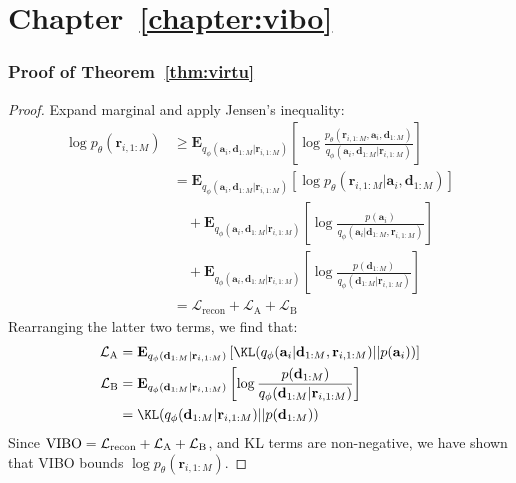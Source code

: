 \section{Chapter~\ref{chapter:vibo}}
\label{sec:proof:vibo}
\subsubsection{Proof of Theorem~\ref{thm:virtu}}

\begin{proof}
    Expand marginal and apply Jensen's inequality:
    \begin{align*}
        \log p_\theta(\mathbf{r}_{i,1:M}) &\geq \mathbf{E}_{q_\phi(\mathbf{a}_i, \mathbf{d}_{1:M}|\mathbf{r}_{i,1:M})}\left[ \log \frac{p_\theta(\mathbf{r}_{i,1:M},\mathbf{a}_i, \mathbf{d}_{1:M})}{q_\phi(\mathbf{a}_i, \mathbf{d}_{1:M}|\mathbf{r}_{i,1:M})} \right] \\
        &= \mathbf{E}_{q_\phi(\mathbf{a}_i, \mathbf{d}_{1:M}|\mathbf{r}_{i,1:M})}\left[ \log p_\theta(\mathbf{r}_{i,1:M}|\mathbf{a}_i, \mathbf{d}_{1:M}) \right] \\
        & \quad + \mathbf{E}_{q_\phi(\mathbf{a}_i, \mathbf{d}_{1:M}|\mathbf{r}_{i,1:M})}\left[ \log \frac{p(\mathbf{a}_i)}{q_\phi(\mathbf{a}_i|\mathbf{d}_{1:M},\mathbf{r}_{i,1:M})} \right] \\
        & \quad + \mathbf{E}_{q_\phi(\mathbf{a}_i, \mathbf{d}_{1:M}|\mathbf{r}_{i,1:M})}\left[ \log \frac{p(\mathbf{d}_{1:M})}{q_\phi(\mathbf{d}_{1:M}|\mathbf{r}_{i,1:M})} \right] \\
        &= \mathcal{L}_{\text{recon}} + \mathcal{L}_{\text{A}} + \mathcal{L}_{\text{B}}
    \end{align*}
    Rearranging the latter two terms, we find that:
    \begin{align*}
    \mathcal{L}_{\text{A}} &= \mathbf{E}_{q_\phi(\mathbf{d}_{1:M}|\mathbf{r}_{i,1:M})} \left[ \KL(q_\phi(\mathbf{a}_i|\mathbf{d}_{1:M},\mathbf{r}_{i,1:M}) || p(\mathbf{a}_i)) \right] \\
    \mathcal{L}_{\text{B}} &= \mathbf{E}_{q_\phi(\mathbf{d}_{1:M}|\mathbf{r}_{i,1:M})}\left[ \log \frac{p(\mathbf{d}_{1:M})}{q_\phi(\mathbf{d}_{1:M}|\mathbf{r}_{i,1:M})} \right] \\
    &= \KL(q_\phi(\mathbf{d}_{1:M}|\mathbf{r}_{i,1:M}) || p(\mathbf{d}_{1:M}))
    \end{align*}
    Since $\textup{VIBO} = \mathcal{L}_{\text{recon}} + \mathcal{L}_{\text{A}} + \mathcal{L}_{\text{B}}$, and KL terms are non-negative, we have shown that VIBO bounds $\log p_\theta(\mathbf{r}_{i,1:M})$.
\end{proof}


